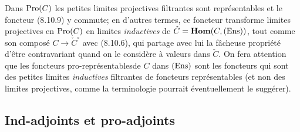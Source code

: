 \documentclass[10pt]{../fichiers-configuration-latex/smfart}
\begin{document}
\subsubsection{}
Dans $\operatorname{Pro}(C)$ les petites limites projectives filtrantes sont
représentables et le foncteur (8.10.9) y commute; en d'autres
termes, ce foncteur transforme limites projectives en $\operatorname{Pro}(C)$ en
limites \emph{inductives} de $\check{C}=\operatorname{\mathbf{Hom}}(C,(\operatorname{Ens}))$, tout comme
son composé $C\rightarrow \check{C}^\circ$ avec (8.10.6), qui
partage avec lui la fâcheuse propriété d'être
contravariant quand on
le considère à valeurs dans $\check{C}$. On fera attention que les
foncteurs pro-représentables\pageoriginale de $C$ dans $(\operatorname{Ens})$ sont
les foncteurs qui sont des petites limites \emph{inductives}
filtrantes de foncteurs représentables (et non des limites
projectives, comme la terminologie pourrait éventuellement le
suggérer).

\subsection{Ind-adjoints et pro-adjoints}
\end{document}
